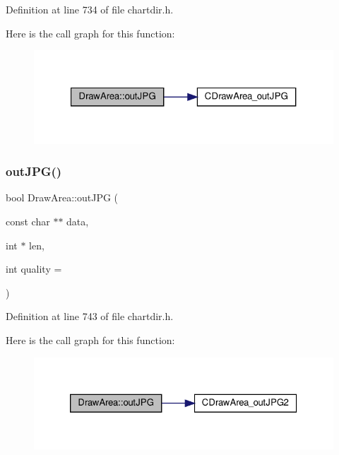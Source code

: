 Definition at line 734 of file chartdir.\+h.

Here is the call graph for this function\+:
\nopagebreak
\begin{figure}[H]
\begin{center}
\leavevmode
\includegraphics[width=321pt]{class_draw_area_aab0ce24f4d0cb06f7b4618a7d1784c62_cgraph}
\end{center}
\end{figure}
\mbox{\label{class_draw_area_a276a1e2a0514b881c22162e6e97a5cb7}} 
\subsubsection{\texorpdfstring{out\+J\+P\+G()}{outJPG()}\hspace{0.1cm}{\footnotesize\ttfamily [2/3]}}
{\footnotesize\ttfamily bool Draw\+Area\+::out\+J\+PG (\begin{DoxyParamCaption}\item[{const char $\ast$$\ast$}]{data,  }\item[{int $\ast$}]{len,  }\item[{int}]{quality = {} }\end{DoxyParamCaption})\hspace{0.3cm}{\ttfamily [inline]}}



Definition at line 743 of file chartdir.\+h.

Here is the call graph for this function\+:
\nopagebreak
\begin{figure}[H]
\begin{center}
\leavevmode
\includegraphics[width=326pt]{class_draw_area_a276a1e2a0514b881c22162e6e97a5cb7_cgraph}
\end{center}
\end{figure}
\mbox{\label{class_draw_area_a67d04710973c1e875c4679ad48236462}} 

